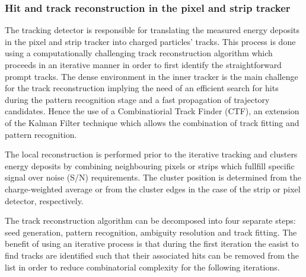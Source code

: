 \subsubsection*{Hit and track reconstruction in the pixel and strip tracker}

The tracking detector is responsible for translating the measured energy deposits in the pixel and strip tracker into charged particles' tracks. This process is done using a computationally challenging track reconstruction algorithm which proceeds in an iterative manner in order to first identify the straightforward prompt tracks.
The dense environment in the inner tracker is the main challenge for the track reconstruction implying the need of an efficient search for hits during the pattern recognition stage and a fast propagation of trajectory candidates. Hence the use of a Combinatiorial Track Finder (CTF), an extension of the Kalman Filter technique which allows the combination of track fitting and pattern recognition.

The local reconstruction is performed prior to the iterative tracking and clusters energy deposits by combining neighbouring pixels or strips which fullfill specific signal over noise (S/N) requirements. The cluster position is determined from the charge-weighted average or from the cluster edges in the case of the strip or pixel detector, respectively.

The track reconstruction algorithm can be decomposed into four separate steps: seed generation, pattern recognition, ambiguity resolution and track fitting.
The benefit of using an iterative process is that during the first iteration the easist to find tracks are identified such that their associated hits can be removed from the list in order to reduce combinatorial complexity for the following iterations.

